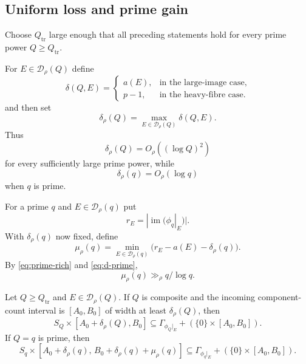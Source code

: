 \subsection{Uniform loss and prime gain}

Choose $Q_{\mathrm{tr}}$ large enough that all preceding statements hold for every prime power $Q\ge Q_{\mathrm{tr}}$.

For $E\in\mathcal D_\rho(Q)$ define
\[
\delta(Q,E)=
\begin{cases}
a(E),&\text{in the large-image case},\\
p-1,&\text{in the heavy-fibre case}.
\end{cases}
\]
and then set
\begin{equation}\label{eq:common-demand}
\delta_\rho(Q)=
\max_{E\in\mathcal D_\rho(Q)}\delta(Q,E).
\end{equation}
Thus
\begin{equation}\label{eq:d-composite}
\delta_\rho(Q)=O_\rho((\log Q)^2)
\end{equation}
for every sufficiently large prime power, while
\begin{equation}\label{eq:d-prime}
\delta_\rho(q)=O_\rho(\log q)
\end{equation}
when $q$ is prime.

For a prime $q$ and $E\in\mathcal D_\rho(q)$ put
\[
r_E=|\operatorname{im}(\phi_q|_E)|.
\]
With $\delta_\rho(q)$ now fixed, define
\begin{equation}\label{eq:common-mint}
\mu_\rho(q)=
\min_{E\in\mathcal D_\rho(q)}
\bigl(r_E-a(E)-\delta_\rho(q)\bigr).
\end{equation}
By \eqref{eq:prime-rich} and \eqref{eq:d-prime},
\begin{equation}\label{eq:mint-prime}
\mu_\rho(q)\gg_\rho q/\log q.
\end{equation}

\begin{theorem}\label{thm:uniform-profile}
Let $Q\ge Q_{\mathrm{tr}}$ and $E\in\mathcal D_\rho(Q)$.  If $Q$ is composite and the incoming component-count interval is $[A_0,B_0]$ of width at least $\delta_\rho(Q)$, then
\[
S_Q\times[A_0+\delta_\rho(Q),B_0]
\subseteq
\Gamma_{\phi_Q|_E}+(\{0\}\times[A_0,B_0]).
\]
If $Q=q$ is prime, then
\[
S_q\times
[A_0+\delta_\rho(q),\,B_0+\delta_\rho(q)+\mu_\rho(q)]
\subseteq
\Gamma_{\phi_q|_E}+(\{0\}\times[A_0,B_0]).
\]
\end{theorem}
